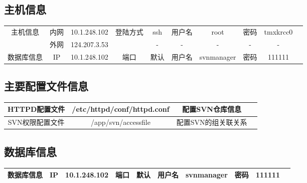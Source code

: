 \documentclass[11pt,a4paper]{article}
\begin{document}
	\subsection {主机信息}
	\begin{table}[!htp]
	\begin{center}
	\begin{tabular}{|c|c|c|c|c|c|c|c|c|c|c|c|c|}
	\hline
	
	\multirow{2}{*}{主机信息} &  
	\multicolumn{2}{c|}{内网} &
	\multicolumn{2}{c|}{10.1.248.102} &
	\multirow{2}{*}{登陆方式} &
	\multicolumn{2}{c|}{ssh} &
	{用户名} &  {root} & {密码} & {tmxkrcc0} \\
	\cline{2-5}
	\cline{7-12}	
	\multirow{2}{*}{} &  
	\multicolumn{2}{c|}{外网} &
	\multicolumn{2}{c|}{124.207.3.53} &
	\multirow{2}{*}{} &
	\multicolumn{2}{c|}{-} &
	{-} & {-} &	{-} &	{-} \\
	\hline
	{数据库信息} &
	\multicolumn{2}{c|}{IP} & 
	\multicolumn{2}{c|}{10.1.248.102}  &
	{端口} & 
	\multicolumn{2}{c|}{默认} &
	{用户名} & {svnmanager} &
	{密码} & {111111} \\
	\hline
	\end{tabular}
	\end{center}
	\end{table}
	
	\subsection {主要配置文件信息}
	\begin{table}[!htp]
	\begin{center}
	\begin{tabular}{|c|c|c|c|c|c|c|c|c|c|c|c|c|}
	\hline
	{HTTPD配置文件} &
	\multicolumn{7}{c|}{/etc/httpd/conf/httpd.conf} &
	\multicolumn{4}{c|}{配置SVN仓库信息} \\
	\hline
	{SVN权限配置文件} &
	\multicolumn{7}{c|}{/app/svn/accessfile} &
	\multicolumn{4}{c|}{配置SVN的组关联关系} \\
	\hline
	\end{tabular}
	\end{center}
	\end{table}
	
	\subsection {数据库信息}
	\begin{table}[!htp]
	\begin{center}
	\begin{tabular}{|c|c|c|c|c|c|c|c|c|c|c|c|c|}
	\hline
	{数据库信息} &
	\multicolumn{2}{c|}{IP} & 
	\multicolumn{2}{c|}{10.1.248.102}  &
	{端口} & 
	\multicolumn{2}{c|}{默认} &
	{用户名} & {svnmanager} &
	{密码} & {111111} \\
	\hline
	\end{tabular}
	\end{center}
	\end{table}
	
\end{document}
